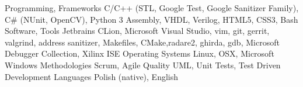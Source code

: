 

\begin{cvskills}

  \cvskill
    {Programming, Frameworks} %
    {C/C++ (STL, Google Test, Google Sanitizer Family), C\# (NUnit, OpenCV), Python 3 \newline
    Assembly, VHDL, Verilog, HTML5, CSS3, Bash} %
    \newline
  \cvskill
    {Software, Tools} %
    {Jetbrains CLion, Microsoft Visual Studio, vim, git, gerrit, valgrind, address sanitizer, Makefiles, CMake,\newline radare2, ghirda, gdb, Microsoft Debugger Collection, Xilinx ISE} %
    \newline
  \cvskill
    {Operating Systems}
    {Linux, OSX, Microsoft Windows}
  \cvskill
    {Methodologies}
    {Scrum, Agile}
  \cvskill
     {Quality}
     {UML, Unit Tests, Test Driven Development}
  \cvskill
    {Languages} %
    {Polish (native), English} %

\end{cvskills}
